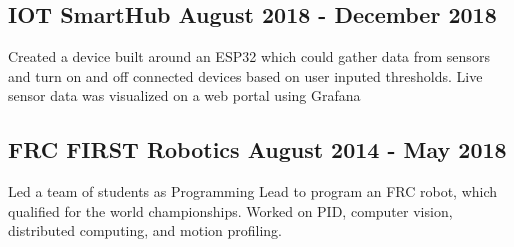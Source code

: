 \documentclass[letterpaper,11pt]{article}
\begin{document}
    \subsection{IOT SmartHub \null\hfill August 2018 - December 2018}
    \vspace*{-2mm}
    Created a device built around an ESP32 which could gather data from sensors and turn on and off connected devices based on user inputed thresholds. Live sensor data was visualized on a web portal using Grafana
    \vspace*{-2mm}
    \subsection{FRC FIRST Robotics \null\hfill August 2014 - May 2018}
    \vspace*{-2mm}
    Led a team of students as Programming Lead to program an FRC robot, which qualified for the world championships. Worked on PID, computer vision, distributed computing, and motion profiling.
    \vspace*{-2mm}
\end{document}
